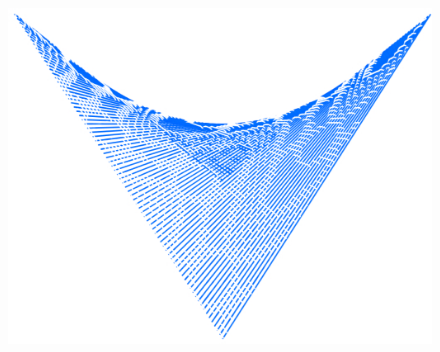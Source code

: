 ﻿%
\begin{figure}[H]
	\centering
	\includegraphics[width=\linewidth]{src/graphics/dynamic-metamorphosis--ideas-form-a.jpg}
	\label{
		fig:dynamic-metamorphosis--ideas-form-a
	}
\end{figure}
